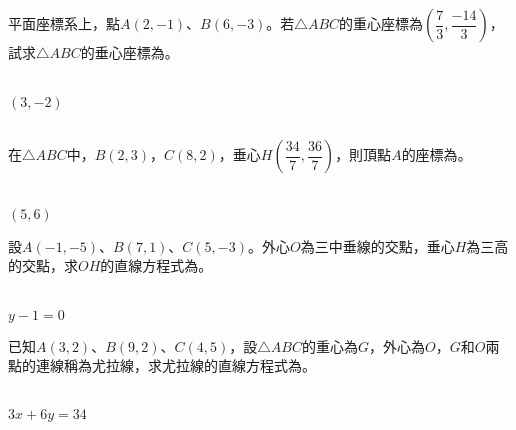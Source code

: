 \documentclass
[answers]
{exam}
\newcommand\ul[1]{\uline{\hspace*{#1}}}
\theoremstyle{definition}
\begin{document}
\begin{questions}
\question

平面座標系上，點$A\left( 2,-1\right)$、$B\left( 6,-3\right)$。若$\triangle ABC$的重心座標為$\left( \dfrac{7}{3},\dfrac{-14}{3}\right)$，試求$\triangle ABC$的垂心座標為\ul{50pt}。
\\ 
\begin{solution}~\\
	$\left( 3,-2 \right)$
\end{solution}

$ $\\

\question

在$\triangle ABC$中，$B\left( 2,3\right)$，$C\left( 8,2\right)$，垂心$H\left( \dfrac{34}{7},\dfrac{36}{7}\right)$，則頂點$A$的座標為\ul{50pt}。
\\ 
\begin{solution}~\\
	$\left( 5,6\right)$
\end{solution}

\question

設$A\left( -1,-5\right)$、$B\left( 7,1\right)$、$C\left( 5,-3\right)$。外心$O$為三中垂線的交點，垂心$H$為三高的交點，求$OH$的直線方程式為\ul{50pt}。
\\ 
\begin{solution}~\\
	$y-1=0$
\end{solution}

\question
已知$A\left( 3,2\right)$、$B\left( 9,2\right)$、$C\left( 4,5\right)$，設$\triangle  ABC$的重心為$G$，外心為$O$，$G$和$O$兩點的連線稱為尤拉線，求尤拉線的直線方程式為\ul{50pt}。
\\ 
\begin{solution}~\\
	$3x+6y=34$
\end{solution}


\end{questions}
\end{document}
